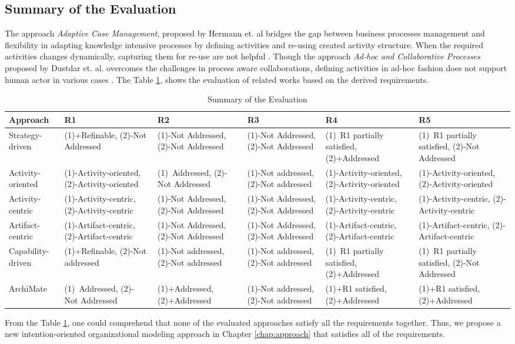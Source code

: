 \subsection {Summary of the Evaluation}
 The approach \textit{Adaptive Case Management}, proposed by Hermann et. al \cite{Herrmann2011} bridges the gap between business processes management and flexibility in adapting knowledge intensive processes by defining activities and re-using created activity structure. When the required activities changes dynamically, capturing them for re-use are not helpful \cite{Sungur2015}. Though the approach \textit{Ad-hoc and Collaborative Processes} proposed by Dustdar et. al. overcomes the challenges in process aware collaborations, defining activities in ad-hoc fashion does not support human actor in various cases \cite{Sungur2015}. The Table \ref{tab:evaluationoftheapproach}, shows the evaluation of related works based on the derived requirements. 

\begin{table}[]
	\scriptsize 
	\centering
	\begin{tabular}{p{2cm}p{2.25cm}p{2.25cm}p{2.25cm}p{2.25cm}p{2.25cm}}
	\toprule
		Approach & R1               & R2               & R3         & R4       & R5        \\
	\midrule
	Strategy-driven & (1)+Refinable, (2)-Not Addressed  & (1)-Not Addressed, (2)-Not Addressed  & (1)-Not Addressed, (2)-Not Addressed  & (1)~R1 partially satisfied, (2)+Addressed  & (1)~R1 partially satisfied, (2)-Not Addressed \\
	Activity-oriented & (1)-Activity-oriented, (2)-Activity-oriented
	 &(1)~Addressed, (2)- Not Addressed  & (1)-Not addressed, (2)-Not addressed   &(1)-Activity-oriented, (2)-Activity-oriented  &(1)-Activity-oriented, (2)-Activity-oriented \\
	Activity-centric & (1)-Activity-centric, (2)-Activity-centric  & (1)-Not Addressed, (2)-Not Addressed  & (1)-Not Addressed, (2)-Not Addressed  &  (1)-Activity-centric, (2)-Activity-centric &  (1)-Activity-centric, (2)-Activity-centric \\
	Artifact-centric    & (1)-Artifact-centric, (2)-Artifact-centric  & (1)-Not Addressed, (2)-Not Addressed  & (1)-Not Addressed, (2)-Not Addressed  & (1)-Artifact-centric, (2)-Artifact-centric & (1)-Artifact-centric, (2)-Artifact-centric  \\ 
	Capability-driven   & (1)+Refinable, (2)-Not addressed & (1)-Not addressed, (2)-Not addressed   & (1)-Not addressed, (2)-Not addressed  & (1)~R1 partially satisfied, (2)+Addressed  & (1)~R1 partially satisfied, (2)-Not Addressed  \\
	ArchiMate  & (1)~Addressed, (2)- Not Addressed & (1)+Addressed, (2)+Addressed & (1)-Not addressed, (2)-Not addressed  & (1)+R1 satisfied, (2)+Addressed & (1)+R1 satisfied, (2)+Addressed\\
	\bottomrule   
	\end{tabular}
	\caption{Summary of the Evaluation}
	\label{tab:evaluationoftheapproach}  
\end{table}


From the Table \ref{tab:evaluationoftheapproach}, one could comprehend that none of the evaluated approaches satisfy all the requirements together. Thus, we propose a new intention-oriented organizational modeling approach in Chapter \ref{chap:approach} that satisfies all of the requirements. 
 


